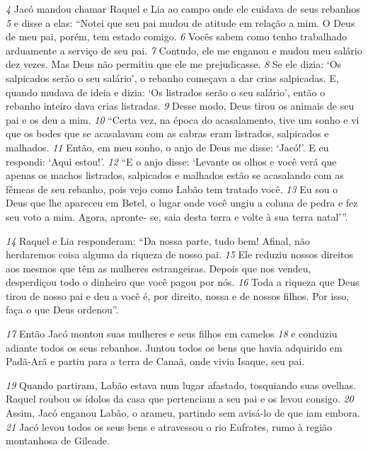 \bigskip   
\textit{\tiny 4} 
Jacó mandou chamar Raquel e Lia ao campo onde ele cuidava de seus
rebanhos 
\textit{\tiny 5} 
e disse a elas: “Notei que seu pai mudou de atitude em relação a mim.
O Deus de meu pai, porém, tem estado comigo. 
\textit{\tiny 6} 
Vocês sabem como tenho
trabalhado arduamente a serviço de seu pai. 
\textit{\tiny 7} 
Contudo, ele me enganou e mudou
meu salário dez vezes. Mas Deus não permitiu que ele me prejudicasse. 
\textit{\tiny 8} 
Se ele
dizia: ‘Os salpicados serão o seu salário’, o rebanho começava a dar crias
salpicadas. E, quando mudava de ideia e dizia: ‘Os listrados serão o seu salário’,
então o rebanho inteiro dava crias listradas. 
\textit{\tiny 9} 
Desse modo, Deus tirou os animais
de seu pai e os deu a mim.
\textit{\tiny 10}
“Certa vez, na época do acasalamento, tive um sonho e vi que os bodes que se
acasalavam com as cabras eram listrados, salpicados e malhados. 
\textit{\tiny 11}
Então, em
meu sonho, o anjo de Deus me disse: ‘Jacó!’. E eu respondi: ‘Aqui estou!’.
\textit{\tiny 12}
“E o anjo disse: ‘Levante os olhos e você verá que apenas os machos listrados,
salpicados e malhados estão se acasalando com as fêmeas de seu rebanho, pois
vejo como Labão tem tratado você. 
\textit{\tiny 13}
Eu sou o Deus que lhe apareceu em Betel,
o lugar onde você ungiu a coluna de pedra e fez seu voto a mim. Agora, apronte-
se, saia desta terra e volte à sua terra natal’”.

\bigskip   
\textit{\tiny 14}
Raquel e Lia responderam: “Da nossa parte, tudo bem! Afinal, não
herdaremos coisa alguma da riqueza de nosso pai. 
\textit{\tiny 15}
Ele reduziu nossos direitos
aos mesmos que têm as mulheres estrangeiras. Depois que nos vendeu,
desperdiçou todo o dinheiro que você pagou por nós. 
\textit{\tiny 16}
Toda a riqueza que Deus
tirou de nosso pai e deu a você é, por direito, nossa e de nossos filhos. Por isso,
faça o que Deus ordenou”.

\bigskip   
\textit{\tiny 17}
Então Jacó montou suas mulheres e seus filhos em camelos 
\textit{\tiny 18}
e conduziu
adiante todos os seus rebanhos. Juntou todos os bens que havia adquirido em
Padã-Arã e partiu para a terra de Canaã, onde vivia Isaque, seu pai. 

\bigskip   
\textit{\tiny 19}
Quando
partiram, Labão estava num lugar afastado, tosquiando suas ovelhas. Raquel
roubou os ídolos da casa que pertenciam a seu pai e os levou consigo. 
\textit{\tiny 20}
Assim,
Jacó enganou Labão, o arameu, partindo sem avisá-lo de que iam embora. 
\textit{\tiny 21}
Jacó
levou todos os seus bens e atravessou o rio Eufrates,
rumo à região montanhosa
de Gileade.

